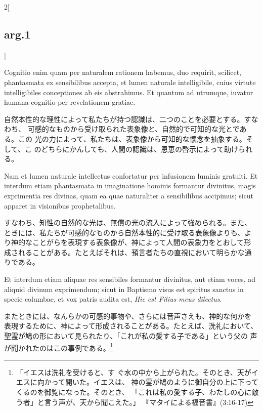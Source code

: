 \documentclass[paper=a4paper,fontsize=10pt,jafontsize=9pt,titlepage]{jlreq}
\begin{document}
\begin{paracol}{2}[\subsection{arg.1}]
\switchcolumn*

Cognitio enim quam per naturalem rationem habemus, duo requirit,
scilicet, phantasmata ex sensibilibus accepta, et lumen naturale
intelligibile, cuius virtute intelligibiles conceptiones ab eis
abstrahimus. Et quantum ad utrumque, iuvatur humana cognitio per
revelationem gratiae.

\switchcolumn

自然本性的な理性によって私たちが持つ認識は、二つのことを必要とする。すなわち、
可感的なものから受け取られた表象像と、自然的で可知的な光とである。この
光の力によって、私たちは、表象像から可知的な懐念を抽象する。そして、こ
のどちらにかんしても、人間の認識は、恩恵の啓示によって助けられる。

\switchcolumn*

Nam et lumen naturale intellectus confortatur per infusionem luminis
gratuiti. Et interdum etiam phantasmata in imaginatione hominis
formantur divinitus, magis exprimentia res divinas, quam ea quae
naturaliter a sensibilibus accipimus; sicut apparet in visionibus
prophetalibus.

\switchcolumn

すなわち、知性の自然的な光は、無償の光の流入によって強められる。また、
ときには、私たちが可感的なものから自然本性的に受け取る表象像よりも、よ
り神的なことがらを表現する表象像が、神によって人間の表象力をとおして形
成されることがある。たとえばそれは、預言者たちの直視において明らかな通
りである。

\switchcolumn*

Et interdum etiam aliquae res sensibiles formantur divinitus, aut
etiam voces, ad aliquid divinum exprimendum; sicut in Baptismo visus
est spiritus sanctus in specie columbae, et vox patris audita est,
{\itshape Hic est Filius meus dilectus}.

\switchcolumn

またときには、なんらかの可感的事物や、さらには音声さえも、神的な何かを
表現するために、神によって形成されることがある。たとえば、洗礼において、
聖霊が鳩の形において見られたり、「これが私の愛する子である」という父の
声が聞かれたのはこの事例である。\footnote{「イエスは洗礼を受けると、す
ぐ水の中から上がられた。そのとき、天がイエスに向かって開いた。イエスは、
神の霊が鳩のように御自分の上に下ってくるのを御覧になった。そのとき、
「これは私の愛する子、わたしの心に敵う者」と言う声が、天から聞こえた。」
『マタイによる福音書』(3:16-17)}

\switchcolumn*[\subsection{ad.1}]


\end{paracol}
\end{document}

